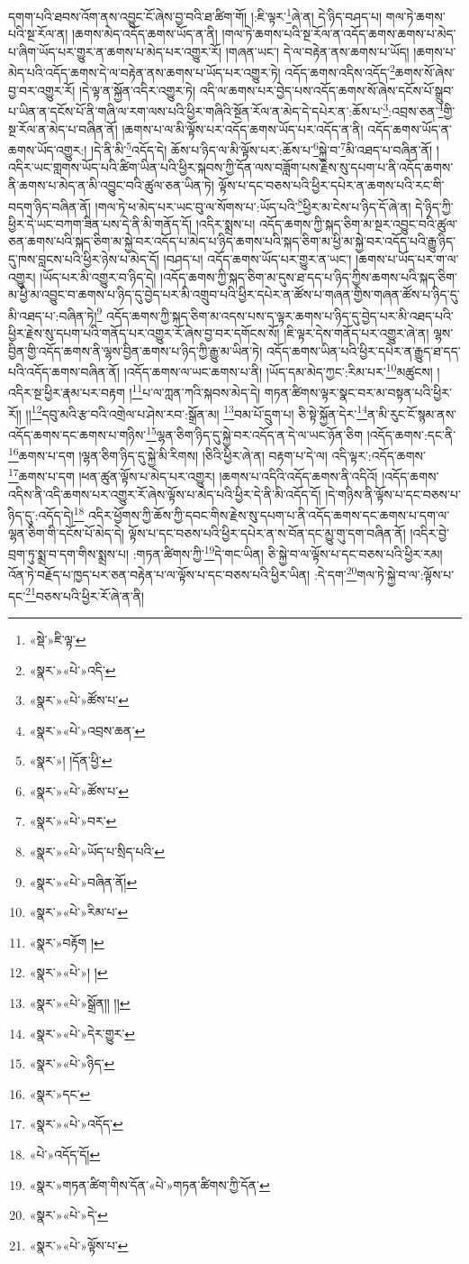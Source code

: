 དགག་པའི་ཐབས་འོག་ནས་འབྱུང་ངོ་ཞེས་བྱ་བའི་ཐ་ཚིག་གོ། །:ཇི་ལྟར་\footnote{«སྡེ་»ཇི་ལྟ་}ཞེ་ན། དེ་ཉིད་བཤད་པ། གལ་ཏེ་ཆགས་པའི་སྔ་རོལ་ན། །ཆགས་མེད་འདོད་ཆགས་ཡོད་ན་ནི། །གལ་ཏེ་ཆགས་པའི་སྔ་རོལ་ན་འདོད་ཆགས་ཆགས་པ་མེད་པ་ཞིག་ཡོད་པར་གྱུར་ན་ཆགས་པ་མེད་པར་འགྱུར་རོ། །གཞན་ཡང་། དེ་ལ་བརྟེན་ནས་ཆགས་པ་ཡོད། །ཆགས་པ་མེད་པའི་འདོད་ཆགས་དེ་ལ་བརྟེན་ནས་ཆགས་པ་ཡོད་པར་འགྱུར་ཏེ། འདོད་ཆགས་འདིས་འདོད་\footnote{«སྣར་»«པེ་»འདི་}ཆགས་སོ་ཞེས་བྱ་བར་འགྱུར་རོ། །དེ་ལྟ་ན་སྐྱོན་འདིར་འགྱུར་ཏེ། འདི་ལ་ཆགས་པར་བྱེད་པས་འདོད་ཆགས་སོ་ཞེས་དངོས་པོ་སྒྲུབ་པ་ཡིན་ན་དངོས་པོ་ནི་གཞི་ལ་རག་ལས་པའི་ཕྱིར་གཞིའི་སྔོན་རོལ་ན་མེད་དེ་དཔེར་ན་:ཆོས་པ་\footnote{«སྣར་»«པེ་»ཚོས་པ་}:འབྲས་ཅན་\footnote{«སྣར་»«པེ་»འབྲས་ཆན་}གྱི་སྔ་རོལ་ན་མེད་པ་བཞིན་ནོ། །ཆགས་པ་ལ་མི་ལྟོས་པར་འདོད་ཆགས་ཡོད་པར་འདོད་ན་ནི། འདོད་ཆགས་ཡོད་ན་ཆགས་ཡོད་འགྱུར:། །དེ་ནི་མི་\footnote{«སྣར་»། །དོན་ཕྱི་}འདོད་དེ། ཆོས་པ་ཉིད་ལ་མི་ལྟོས་པར་:ཆོས་པ་\footnote{«སྣར་»«པེ་»ཚོས་པ་}སྐྱེ་བ་\footnote{«སྣར་»«པེ་»བར་}མི་འཐད་པ་བཞིན་ནོ། །འདིར་ཡང་གླགས་ཡོད་པའི་ཚིག་ཡིན་པའི་ཕྱིར་སྐབས་ཀྱི་དོན་ལས་བཟློག་པས་རྗེས་སུ་དཔག་པ་ནི་འདོད་ཆགས་ནི་ཆགས་པ་མེད་ན་མི་འབྱུང་བའི་ཚུལ་ཅན་ཡིན་ཏེ། ལྟོས་པ་དང་བཅས་པའི་ཕྱིར་དཔེར་ན་ཆགས་པའི་རང་གི་བདག་ཉིད་བཞིན་ནོ། །གལ་ཏེ་ཕ་མེད་པར་ཡང་བུ་ལ་སོགས་པ་:ཡོད་པའི་\footnote{«སྣར་»«པེ་»ཡོད་པ་སྲིད་པའི་}ཕྱིར་མ་ངེས་པ་ཉིད་དོ་ཞེ་ན། དེ་ཉིད་ཀྱི་ཕྱིར་དེ་ཡང་བཀག་ཟིན་པས་དེ་ནི་མི་གནོད་དོ། །འདིར་སྨྲས་པ། འདོད་ཆགས་ཀྱི་སྐད་ཅིག་མ་སྔར་འབྱུང་བའི་ཚུལ་ཅན་ཆགས་པའི་སྐད་ཅིག་མ་སྐྱེ་བར་འདོད་པ་མེད་པ་ཉིད་ཆགས་པའི་སྐད་ཅིག་མ་ཕྱི་མ་སྐྱེ་བར་འདོད་པའི་རྒྱུ་ཉིད་དུ་ཁས་བླངས་པའི་ཕྱིར་ཉེས་པ་མེད་དོ། །བཤད་པ། འདོད་ཆགས་ཡོད་པར་གྱུར་ན་ཡང་། །ཆགས་པ་ཡོད་པར་ག་ལ་འགྱུར། །ཡོད་པར་མི་འགྱུར་བ་ཉིད་དེ། །འདོད་ཆགས་ཀྱི་སྐད་ཅིག་མ་དུས་ཐ་དད་པ་ཉིད་ཀྱིས་ཆགས་པའི་སྐད་ཅིག་མ་ཕྱི་མ་འབྱུང་བ་ཆགས་པ་ཉིད་དུ་བྱེད་པར་མི་འགྲུབ་པའི་ཕྱིར་དཔེར་ན་ཚོས་པ་གཞན་གྱིས་གཞན་ཚོས་པ་ཉིད་དུ་མི་འཐད་པ་:བཞིན་ཏེ།\footnote{«སྣར་»«པེ་»བཞིན་ནོ།} འདོད་ཆགས་ཀྱི་སྐད་ཅིག་མ་འདས་པས་ད་ལྟར་ཆགས་པ་ཉིད་དུ་བྱེད་པར་མི་འཐད་པའི་ཕྱིར་རྗེས་སུ་དཔག་པའི་གནོད་པར་འགྱུར་རོ་ཞེས་བྱ་བར་དགོངས་སོ། །ཇི་ལྟར་དེས་གནོད་པར་འགྱུར་ཞེ་ན། ལྷས་བྱིན་གྱི་འདོད་ཆགས་ནི་ལྷས་བྱིན་ཆགས་པ་ཉིད་ཀྱི་རྒྱུ་མ་ཡིན་ཏེ། འདོད་ཆགས་ཡིན་པའི་ཕྱིར་དཔེར་ན་རྒྱུད་ཐ་དད་པའི་འདོད་ཆགས་བཞིན་ནོ། །འདོད་ཆགས་ལ་ཡང་ཆགས་པ་ནི། །ཡོད་དམ་མེད་ཀྱང་:རིམ་པར་\footnote{«སྣར་»«པེ་»རིམ་པ་}མཚུངས། །འདིར་སྔ་ཕྱིར་རྣམ་པར་བརྟག །\footnote{«སྣར་»བརྟོག །}པ་ལ་ཀླན་ཀའི་སྐབས་མེད་དེ། གཏན་ཚིགས་ལྟར་སྣང་བར་མ་བསྟན་པའི་ཕྱིར་རོ།། །།\footnote{«སྣར་»«པེ་»། །}དབུ་མའི་རྩ་བའི་འགྲེལ་པ་ཤེས་རབ་:སྒྲོན་མ། \footnote{«སྣར་»«པེ་»སྒྲོན།། །། }བམ་པོ་དྲུག་པ། ཅི་སྟེ་སྐྱོན་དེར་\footnote{«སྣར་»«པེ་»དེར་གྱུར་}ན་མི་རུང་ངོ་སྙམ་ནས་འདོད་ཆགས་དང་ཆགས་པ་གཉིས་\footnote{«སྣར་»«པེ་»ཉིད་}ལྷན་ཅིག་ཉིད་དུ་སྐྱེ་བར་འདོད་ན་དེ་ལ་ཡང་ཉོན་ཅིག །འདོད་ཆགས་:དང་ནི་\footnote{«སྣར་»དང་}ཆགས་པ་དག །ལྷན་ཅིག་ཉིད་དུ་སྐྱེ་མི་རིགས། །ཅིའི་ཕྱིར་ཞེ་ན། བརྟག་པ་དེ་ལ། འདི་ལྟར་:འདོད་ཆགས་\footnote{«སྣར་»«པེ་»འདོད་}ཆགས་པ་དག །ཕན་ཚུན་ལྟོས་པ་མེད་པར་འགྱུར། །ཆགས་པ་འདིའི་འདོད་ཆགས་ནི་འདིའོ། །འདོད་ཆགས་འདིས་ནི་འདི་ཆགས་པར་འགྱུར་རོ་ཞེས་ལྟོས་པ་མེད་པའི་ཕྱིར་དེ་ནི་མི་འདོད་དོ། །དེ་གཉིས་ནི་ལྟོས་པ་དང་བཅས་པ་ཉིད་དུ་:འདོད་དེ།\footnote{«པེ་»འདོད་དོ།} འདིར་ཕྱོགས་ཀྱི་ཆོས་ཀྱི་དབང་གིས་རྗེས་སུ་དཔག་པ་ནི་འདོད་ཆགས་དང་ཆགས་པ་དག་ལ་ལྷན་ཅིག་གི་དངོས་པོ་མེད་དེ། ལྟོས་པ་དང་བཅས་པའི་ཕྱིར་དཔེར་ན་ས་བོན་དང་མྱུ་གུ་དག་བཞིན་ནོ། །འདིར་བྱེ་བྲག་ཏུ་སྨྲ་བ་དག་གིས་སྨྲས་པ། :གཏན་ཚིགས་ཀྱི་\footnote{«སྣར་»གཏན་ཚིག་གིས་དོན་«པེ་»གཏན་ཚིགས་ཀྱི་དོན་}དེ་གང་ཡིན། ཅི་སྐྱེ་བ་ལ་ལྟོས་པ་དང་བཅས་པའི་ཕྱིར་རམ། འོན་ཏེ་བརྗོད་པ་ཁྱད་པར་ཅན་བརྟེན་པ་ལ་ལྟོས་པ་དང་བཅས་པའི་ཕྱིར་ཡིན། :དེ་དག་\footnote{«སྣར་»«པེ་»དེ་}གལ་ཏེ་སྐྱེ་བ་ལ་:ལྟོས་པ་དང་\footnote{«སྣར་»«པེ་»ལྟོས་པ་}བཅས་པའི་ཕྱིར་རོ་ཞེ་ན་ནི། 